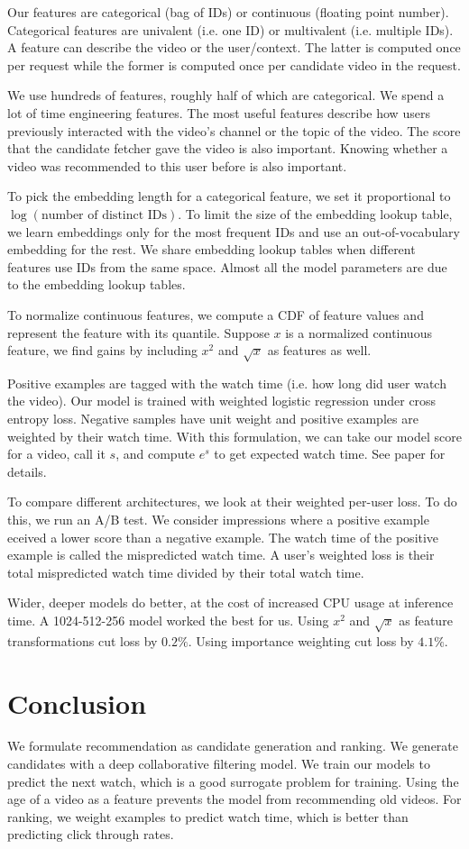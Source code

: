 \documentclass[a4paper]{article}
\begin{document}
Our features are categorical (bag of IDs) or continuous (floating point number).
Categorical features are univalent (i.e. one ID) or multivalent (i.e. multiple
IDs). A feature can describe the video or the user/context. The latter is
computed once per request while the former is computed once per candidate video
in the request.

We use hundreds of features, roughly half of which are categorical. We spend a
lot of time engineering features. The most useful features describe how users
previously interacted with the video's channel or the topic of the video. The
score that the candidate fetcher gave the video is also important. Knowing
whether a video was recommended to this user before is also important.

To pick the embedding length for a categorical feature, we set it proportional
to $\log(\textrm{number of distinct IDs})$. To limit the size of the embedding
lookup table, we learn embeddings only for the most frequent IDs and use an
out-of-vocabulary embedding for the rest. We share embedding lookup tables when
different features use IDs from the same space. Almost all the model parameters
are due to the embedding lookup tables.

To normalize continuous features, we compute a CDF of feature values and
represent the feature with its quantile. Suppose $x$ is a normalized
continuous feature, we find gains by including $x^2$ and $\sqrt{x}$ as
features as well.

Positive examples are tagged with the watch time (i.e. how long did user watch
the video). Our model is trained with weighted logistic regression under
cross entropy loss. Negative samples have unit weight and positive examples
are weighted by their watch time. With this formulation, we can take our model
score for a video, call it $s$, and compute $e^{s}$ to get expected watch time.
See paper for details.

To compare different architectures, we look at their weighted per-user loss.
To do this, we run an A/B test. We consider impressions where a positive example
eceived a lower score than a negative example. The watch time of the positive
example is called the mispredicted watch time. A user's weighted loss is their
total mispredicted watch time divided by their total watch time.

Wider, deeper models do better, at the cost of increased CPU usage at inference
time. A 1024-512-256 model worked the best for us. Using $x^2$ and $\sqrt{x}$
as feature transformations cut loss by $0.2\%$. Using importance weighting cut
loss by $4.1\%$.

\section{Conclusion}
We formulate recommendation as candidate generation and ranking. We generate
candidates with a deep collaborative filtering model. We train our models to
predict the next watch, which is a good surrogate problem for training. Using
the age of a video as a feature prevents the model from recommending old videos.
For ranking, we weight examples to predict watch time, which is better than
predicting click through rates.
\end{document}
